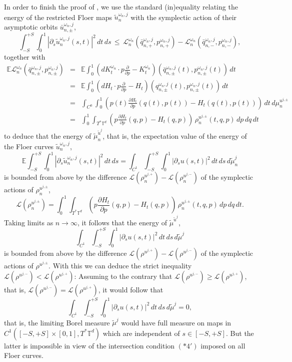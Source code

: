 \documentclass[a4paper,11pt]{amsart}
\newcommand{\TT}{\mathbb{T}}
\newcommand{\EE}{\mathbb{E}}
\begin{document}
In order to finish the proof of , we use the standard (in)equality relating the energy of the restricted Floer maps $\widetilde{u}^{\omega_n,j}_n$ with the symplectic action of their asymptotic orbits $\bar{u}^{\omega_n,j}_{n,\pm}$, \[\int_{-S}^{+S}\int_0^1 \left|\partial_s\widetilde{u}^{\omega_n,j}_n(s,t)\right|^2\,dt\,ds \,\leq\, \mathcal{L}_n^{\omega_n}(\bar{q}^{\omega_n,j}_{n,+},p^{\omega_n,j}_{n,+}) - \mathcal{L}_n^{\omega_n}(\bar{q}^{\omega_n,j}_{n,-},p^{\omega_n,j}_{n,-}),\] together with 
\begin{eqnarray*} \EE\mathcal{L}_n^{\omega_n}(\bar{q}^{\omega_n,j}_{n,\pm},p^{\omega_n,j}_{n,\pm})&=&\EE\int_0^1 \left( dK^{\omega_n}_t\cdot p\frac{\partial}{\partial p}-K^{\omega_n}_t\right)(\bar{q}^{\omega_n,j}_{n,\pm}(t),p^{\omega_n,j}_{n,\pm}(t))\,dt\\&=&\EE\int_0^1 \left( dH_t\cdot p\frac{\partial}{\partial p}-H_t\right)(q^{\omega_n,j}_{n,\pm}(t),p^{\omega_n,j}_{n,\pm}(t))\,dt\\&=&\int_{C^0}\int_0^1 \left(p(t)\frac{\partial H_t}{\partial p}(q(t),p(t))- H_t(q(t),p(t))\right)\,dt\,d\mu_n^{u^{j,\pm}}\\&=&\int_0^1\int_{T^*\TT^d} \left(p\frac{\partial H_t}{\partial p}(q,p)- H_t(q,p)\right)\,\rho^{u^{j,\pm}}_n(t,q,p) \,dp\,dq \,dt
\end{eqnarray*}
to deduce that the energy of $\widetilde{\mu}^{\widetilde{u}^j}_n$, that is, the expectation value of the energy of the Floer curves $\widetilde{u}^{\omega_n,j}_n$, \[\EE\int_{-S}^{+S}\int_0^1 \left|\partial_s\widetilde{u}^{\omega_n,j}_n(s,t)\right|^2\,dt\,ds=\int_{C^1}\int_{-S}^{+S}\int_0^1 \left|\partial_s u(s,t)\right|^2\,dt\,ds\,d\widetilde{\mu}^j_n\] is bounded from above by the difference $\mathcal{L}(\rho^{u^{j,+}}_n)-\mathcal{L}(\rho^{u^{j,-}}_n)$ of the symplectic actions of $\rho^{u^{j,\pm}}_n$, \[\mathcal{L}(\rho^{u^{j,\pm}}_n)=\int_0^1\int_{T^*\TT^d} \left(p\frac{\partial H_t}{\partial p}(q,p)- H_t(q,p)\right)\,\rho^{u^{j,\pm}}_n(t,q,p) \,dp\,dq \,dt.\]
Taking limits as $n\to\infty$, it follows that the energy of $\widetilde{\mu}^{\widetilde{u}^j}$, \[\int_{C^1}\int_{-S}^{+S}\int_0^1 \left|\partial_s u(s,t)\right|^2\,dt\,ds\,d\widetilde{\mu}^j\] is bounded from above by the difference $\mathcal{L}(\rho^{u^{j,+}})-\mathcal{L}(\rho^{u^{j,-}})$ of the symplectic actions of $\rho^{u^{j,\pm}}$. With this we can deduce the strict inequality $\mathcal{L}(\rho^{u^{j,-}})<\mathcal{L}(\rho^{u^{j,+}})$: 
Assuming to the contrary that $\mathcal{L}(\rho^{u^{j,-}})\geq\mathcal{L}(\rho^{u^{j,+}})$, that is, $\mathcal{L}(\rho^{u^{j,-}})=\mathcal{L}(\rho^{u^{j,+}})$, it would follow that \[\int_{C^1}\int_{-S}^{+S}\int_0^1 \left|\partial_s u(s,t)\right|^2\,dt\,ds\,d\widetilde{\mu}^j=0,\] that is, the limiting Borel measure $\widetilde{\mu}^j$ would have full measure on maps in $C^1([-S,+S]\times[0,1],T^*\TT^d)$ which are independent of $s\in [-S,+S]$. But the latter is impossible in view of the intersection condition $(*4')$ imposed on all Floer curves.\\ 
\end{document}
